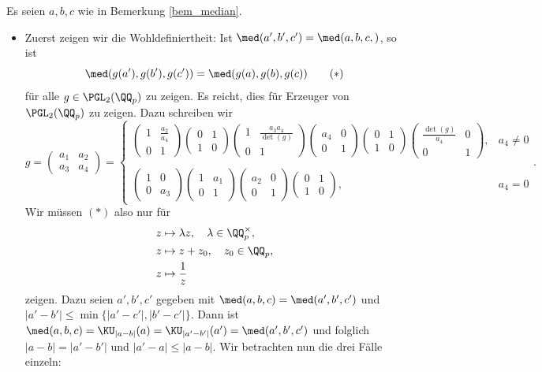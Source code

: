 \bew Es seien $a,b,c$ wie in Bemerkung
\ref{bem_median}.
\begin{itemize}
\item Zuerst zeigen wir die Wohldefiniertheit:
Ist $\med(a',b',c')=\med(a,b,c,)$, so ist
\[
\med(g(a'),g(b'),g(c'))
=\med(g(a),g(b),g(c))
\qquad (*)
\]
für alle $g\in\PGL_2(\QQ_p)$ zu zeigen.
Es reicht, dies für Erzeuger von $\PGL_2(\QQ_p)$ zu zeigen.
Dazu schreiben wir
\[
g = \begin{pmatrix} a_1 & a_2 \\ a_3 & a_4 \end{pmatrix}
=
\left\{\begin{matrix}
\begin{pmatrix} 1 & \frac{a_2}{a_4} \\ 0 & 1 \end{pmatrix}
\begin{pmatrix} 0 & 1 \\ 1 & 0 \end{pmatrix}
\begin{pmatrix} 1 & \frac{a_3 a_4}{\det(g)} \\ 0 & 1 \end{pmatrix}
\begin{pmatrix} a_4 & 0 \\ 0 & 1 \end{pmatrix}
\begin{pmatrix} 0 & 1 \\ 1 & 0 \end{pmatrix}
\begin{pmatrix} \frac{\det(g)}{a_4} & 0 \\ 0 & 1 \end{pmatrix}, & a_4\neq 0 \\ \\
\begin{pmatrix} 1 & 0 \\ 0 & a_3 \end{pmatrix}
\begin{pmatrix} 1 & a_1 \\ 0 & 1 \end{pmatrix}
\begin{pmatrix} a_2 & 0 \\ 0 & 1 \end{pmatrix}
\begin{pmatrix} 0 & 1 \\ 1 & 0 \end{pmatrix}, & a_4=0
\end{matrix}\right..
\]
Wir müssen $(*)$ also nur für
\begin{align*}
&z\mapsto \lambda z,\quad \lambda \in \QQ_p^\times, \\
&z\mapsto z+z_0,\quad z_0 \in \QQ_p, \\
&z\mapsto\frac{1}{z}
\end{align*}
zeigen.
Dazu seien $a',b',c'$ gegeben mit $\med(a,b,c)=\med(a',b',c')$
und $|a'-b'|\leq\min\{|a'-c'|,|b'-c'|\}$.
Dann ist
$\med(a,b,c)=\KU_{|a-b|}(a)=\KU_{|a'-b'|}(a')=\med(a',b',c')$ und
folglich $|a-b|=|a'-b'|$ und $|a'-a|\leq|a-b|$.
Wir betrachten nun die drei Fälle einzeln:


\end{itemize}
